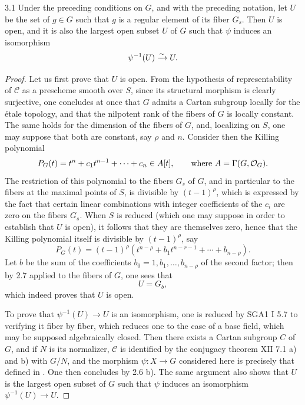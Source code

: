 \begin{theorem}{3.1}\label{XIII.3.1}
Under the preceding conditions on $G$, and with the preceding notation,
let $U$ be the set of $g\in G$ such that $g$ is a regular element of
its fiber $G_s$. Then $U$ is open, and it is also the largest open subset
$U$ of $G$ such that $\psi$ induces an isomorphism
\[
 \psi^{-1}(U)\xrightarrow{\sim} U.
\]
\end{theorem}
\begin{proof}
Let us first prove that $U$ is open. From the hypothesis of representability
of $\mathcal C$ as a prescheme smooth over $S$, since its structural
morphism is clearly surjective, one concludes at once that $G$ admits a
Cartan subgroup locally for the \'etale topology, and that the nilpotent
rank of the fibers of $G$ is locally constant. The same holds for the
dimension of the fibers of $G$, and, localizing on $S$, one may suppose
that both are constant, say $\rho$ and $n$. Consider then the Killing
polynomial
\[
 P_G(t)=t^n+c_1t^{n-1}+\cdots+c_n\in A[t],
 \qquad\text{where }A=\Gamma(G,\mathcal{O}_G).
\]
The restriction of this polynomial to the fibers $G_s$ of $G$, and in
particular to the fibers at the maximal points of $S$, is divisible
by $(t-1)^\rho$, which is expressed by the fact that certain linear
combinations with integer coefficients of the $c_i$ are zero on the
fibers $G_s$. When $S$ is reduced (which one may suppose in order to
establish that $U$ is open), it follows that they are themselves zero,
hence that the Killing polynomial itself is divisible by $(t-1)^\rho$,
say
\[
 P_G(t)=(t-1)^\rho(t^{n-\rho}+b_1t^{n-r-1}+\cdots+b_{n-\rho}).
\]
Let $b$ be the sum of the coefficients $b_0=1,b_1,\ldots,b_{n-\rho}$ of
the second factor; then by 2.7 applied to the fibers of $G$, one sees that
\[
 U=G_b,
\]
which indeed proves that $U$ is open.

To prove that $\psi^{-1}(U)\to U$ is an isomorphism, one is reduced by
SGA1 I 5.7 to verifying it fiber by fiber, which reduces one to the case
of a base field, which may be supposed algebraically closed. Then there
exists a Cartan subgroup $C$ of $G$, and if $N$ is its normalizer,
$\mathcal C$ is identified by the conjugacy theorem XII 7.1 a) and b)
with $G/N$, and the morphism $\psi:X\to G$ considered here is precisely
that defined in . One then concludes by 2.6 b). The same argument
also shows that $U$ is the largest open subset of $G$ such that $\psi$
induces an isomorphism $\psi^{-1}(U)\to U$.
\end{proof}

